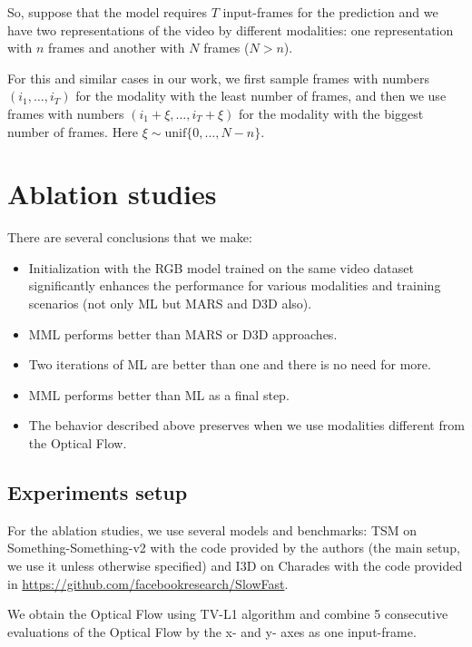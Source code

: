 \documentclass[conference]{IEEEtran}
\begin{document}
So, suppose that the model requires $T$ input-frames for the prediction and we have two representations of the video by different modalities: one representation with $n$ frames and another with $N$ frames ($N>n$).

For this and similar cases in our work, we first sample frames with numbers $(i_1,\ldots,i_T)$ for the modality with the least number of frames, and then we use frames with numbers $(i_1+\xi,\ldots,i_T+\xi)$ for the modality with the biggest number of frames. Here $\xi\sim\text{unif}\{0,\ldots,N-n\}$.

\section{Ablation studies} \label{sec:ablation}

There are several conclusions that we make:
\begin{itemize}
\item Initialization with the RGB model trained on the same video dataset significantly enhances the performance for various modalities and training scenarios (not only ML but MARS and D3D also).
\item MML performs better than MARS or D3D approaches.
\item Two iterations of ML are better than one and there is no need for more.
\item MML performs better than ML as a final step.
\item The behavior described above preserves when we use modalities different from the Optical Flow.
\end{itemize}

\subsection{Experiments setup}

For the ablation studies, we use several models and benchmarks: TSM \cite{shao2020temporal} on Something-Something-v2 \cite{goyal2017something} with the code provided by the authors (the main setup, we use it unless otherwise specified) and I3D \cite{carreira2017quo} on Charades \cite{Sigurdsson2016HollywoodIH} with the code provided in \url{https://github.com/facebookresearch/SlowFast}.

We obtain the Optical Flow using TV-L1 algorithm \cite{zach2007duality} and combine 5 consecutive evaluations of the Optical Flow by the x- and y- axes as one input-frame.
\end{document}
